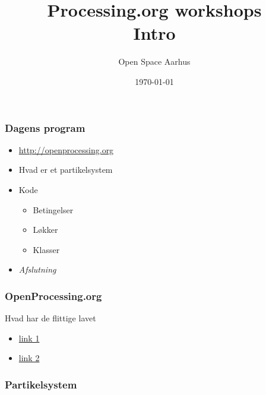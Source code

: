 \documentclass{beamer}
\title{Processing.org workshops\\Intro}
\author{Open Space Aarhus}
\date{\today}
\institute[Bryggervej 30]{Bryggervej 30, 8240 Århus N}
\begin{document}
\begin{frame}[label=titlepage]
  \titlepage
\end{frame}

\begin{frame}
  \frametitle{Dagens program}
  \begin{itemize}
  \item \url{http://openprocessing.org}
  \item Hvad er et partikelsystem
  \item Kode
    \begin{itemize}
    \item Betingelser
    \item Løkker
    \item Klasser
    \end{itemize}

  \item \emph{Afslutning}
    
  \end{itemize}						
\end{frame}


\begin{frame}
  \frametitle{OpenProcessing.org}
  \begin{block}{Hvad har de flittige lavet}
    \begin{itemize}
    \item \url{link 1}
    \item \url{link 2}
    \end{itemize}
  \end{block}
\end{frame}



\begin{frame}
  \frametitle{Partikelsystem}


\end{frame}

\begin{frame}
  \frametitle{}
\end{frame}

\begin{frame}
  \frametitle{}
\end{frame}

\begin{frame}
  \frametitle{}
\end{frame}

\begin{frame}
  \frametitle{}
\end{frame}
\end{document}
